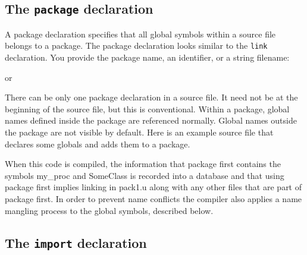 \subsection*{The \texttt{package} declaration}

A package declaration specifies that all global symbols within a source file
belongs to a package.  The package declaration looks similar to the
\texttt{link} declaration. You provide the package name, an
identifier, or a string filename:


or


There can be only one package declaration in a source file. It need not be at
the beginning of the source file, but this is conventional.  Within a package,
global names defined inside the package are referenced normally. Global names
outside the package are not visible by default. Here is an example source file
that declares some globals and adds them to a package.

\bigskip


When this code is compiled, the information that package first contains
the symbols \textsf{my\_proc} and \textsf{SomeClass} is recorded into a
database and that using package \textsf{first} implies linking in
\textsf{pack1.u} along with any other files that are part of package
\textsf{first}. In order to prevent name conflicts the compiler also
applies a name mangling process to the global symbols, described below.

\subsection*{The \texttt{import} declaration}

